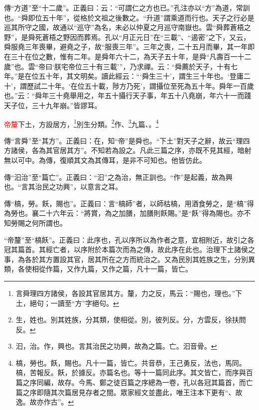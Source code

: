 {\noindent\zhuan{}\fzbyks 傳“方道”至“十二歲”。正義曰：云：“可謂仁之方也已。”孔注亦以“方”為道，常訓也。“舜即位五十年”，從格於文祖之後數之。“升道”謂乘道而行也。天子之行必是巡其所守之國，故通以“巡守”為名，未必以仲夏之月巡守南嶽也。雲“舜葬蒼梧之野”，是舜死蒼梧之野因而葬焉。孔以“月正元日”在“三載”、“遏密”之下，又云，舜服堯三年喪畢，避堯之子，故“服喪三年”。三年之喪，二十五月而畢，其一年即在三十在位之數，惟有二年。是舜年六十二，為天子五十年，是舜“凡壽百一十二歲”也。雲“帝曰‘朕宅帝位三十有三載’”，乃求禪。云：“舜薦於天子，十有七年。”是在位五十年，其文明矣。讀此經云：“‘舜生三十’，謂生三十年也。‘登庸二十’，謂歷試二十年。‘在位五十載，陟方乃死’，謂攝位至死為五十年。舜年一百歲也。”云：“舜年三十堯舉用之，年五十攝行天子事，年五十八堯崩，年六十一而踐天子位，三十九年崩。”皆謬耳。 \par}

\textcolor{red}{帝釐}下土，方設居方，\footnote{言舜理四方諸侯，各設其官居其方。釐，力之反，馬云：“賜也，理也。”下土，絕句；一讀至“方”字絕句。}別生分類。\footnote{生，姓也。別其姓族，分其類，使相從。別，彼列反。分，方雲反，徐扶問反。}作、\footnote{汩，治。作，興也。言其治民之功興，故為之篇。亡。汩音骨。}九篇、\CJKunderwave{\textcolor{red}{槁飫}}。\footnote{槁，勞也。飫，賜也。凡十一篇，皆亡。共音恭，王己勇反，法也，馬同。槁，苦報反。飫，於據反。亦篇名也。等十一篇同此序。其文皆亡，而序與百篇之序同編，故存。今馬、鄭之徒百篇之序總為一卷，孔以各冠其篇首，而亡篇之序即隨其次篇居見存者之間。眾家經文並盡此，唯王注本下更有“、故逸。故亦作古”。}

{\noindent\zhuan{}\fzbyks 傳“言舜”至“其方”。正義曰：在，知“帝”是舜也。“下土”對天子之辭，故云“理四方諸侯，各為其官居其方”。不知若為設之。凡此三篇之序，亦既不見其經，暗射無以可中。為傳，復順其文為其傳耳，是非不可知也。他皆仿此。 \par}

{\noindent\zhuan{}\fzbyks 傳“汩治”至“篇亡”。正義曰：“汩”之為治，無正訓也。“作”是起義，故為興也。“言其治民之功興”，以意言之耳。 \par}

{\noindent\zhuan{}\fzbyks 傳“槁，勞。飫，賜也”。正義曰：言“槁師”者，以師枯槁，用酒食勞之，是“槁”得為勞也。襄二十六年云：“將賞，為之加膳，加膳則飫賜。”是“飫”得為賜也。亦不知勞賜之何所謂也。 \par}

{\noindent\shu{}\fzkt “帝釐”至“槁飫”。正義曰：此序也，孔以序所以為作者之意，宜相附近，故引之各冠其篇首。其經亡者，以序附於本篇次而為之傳，故此序在此也。治理下土諸侯之事，為各於其方置設其官，居其所在之方而統治之。又為民別其姓族之生，分別異類，各使相從作篇，又作九篇，又作之篇，凡十一篇，皆亡。 \par}

